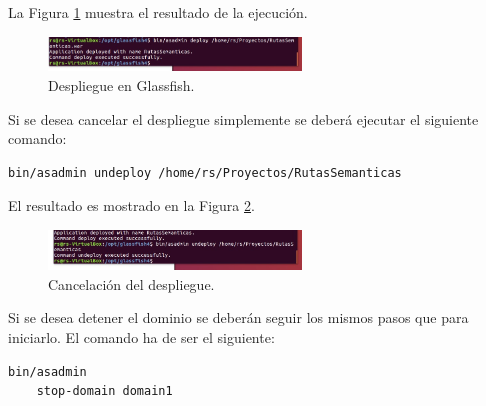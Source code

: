La Figura \ref{deploy} muestra el resultado de la ejecución.
\begin{figure}[h]
  \centering
    \includegraphics[width=0.6\textwidth]{../img/glass/despliegue.jpg}
  \caption{Despliegue en Glassfish.}
  \label{deploy}
\end{figure}

Si se desea cancelar el despliegue simplemente se deberá ejecutar el siguiente comando:

\begin{lstlisting}[language=bash]
	bin/asadmin undeploy /home/rs/Proyectos/RutasSemanticas
\end{lstlisting}

El resultado es mostrado en la Figura \ref{undeploy}.

\begin{figure}[h]
  \centering
    \includegraphics[width=0.6\textwidth]{../img/glass/undeploy.jpg}
  \caption{Cancelación del despliegue.}
  \label{undeploy}
\end{figure}

Si se desea detener el dominio se deberán seguir los mismos pasos que para iniciarlo. El comando ha de ser el siguiente:

\begin{lstlisting}[language=bash]
	bin/asadmin
	stop-domain domain1		
\end{lstlisting}